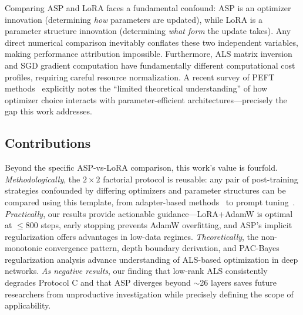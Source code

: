 \documentclass[11pt]{article}
\begin{document}
Comparing ASP and LoRA faces a fundamental confound: ASP is an optimizer innovation (determining \textit{how} parameters are updated), while LoRA is a parameter structure innovation (determining \textit{what form} the update takes). Any direct numerical comparison inevitably conflates these two independent variables, making performance attribution impossible. Furthermore, ALS matrix inversion and SGD gradient computation have fundamentally different computational cost profiles, requiring careful resource normalization. A recent survey of PEFT methods~\cite{lialin2023scaling} explicitly notes the ``limited theoretical understanding'' of how optimizer choice interacts with parameter-efficient architectures---precisely the gap this work addresses.

\subsection{Contributions}

Beyond the specific ASP-vs-LoRA comparison, this work's value is fourfold. \textit{Methodologically}, the $2\times 2$ factorial protocol is reusable: any pair of post-training strategies confounded by differing optimizers and parameter structures can be compared using this template, from adapter-based methods~\cite{houlsby2019parameter} to prompt tuning~\cite{lester2021power}. \textit{Practically}, our results provide actionable guidance---LoRA+AdamW is optimal at $\leq 800$ steps, early stopping prevents AdamW overfitting, and ASP's implicit regularization offers advantages in low-data regimes. \textit{Theoretically}, the non-monotonic convergence pattern, depth boundary derivation, and PAC-Bayes regularization analysis advance understanding of ALS-based optimization in deep networks. \textit{As negative results}, our finding that low-rank ALS consistently degrades Protocol C and that ASP diverges beyond $\sim$26 layers saves future researchers from unproductive investigation while precisely defining the scope of applicability.
\end{document}
